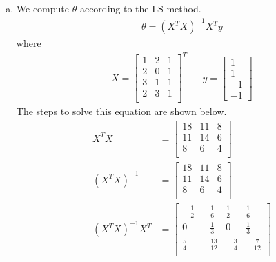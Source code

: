 \documentclass[a4paper, 10pt, twoside]{article}
\begin{document}
\begin{enumerate}[a)]
    \item We compute $\theta$ according to the LS-method.
          \begin{align}
              \theta = (X^TX)^{-1}X^Ty
          \end{align}
          where
          \begin{align*}
              X =
              \begin{bmatrix}
                  1 & 2 & 1 \\
                  2 & 0 & 1 \\
                  3 & 1 & 1 \\
                  2 & 3 & 1 \\
              \end{bmatrix}^T
               &  &
              y =
              \begin{bmatrix}
                  1 \\ 1 \\ -1 \\ -1
              \end{bmatrix}
          \end{align*}
          The steps to solve this equation are shown below.
          \begin{align*}
              X^TX           & =
              \begin{bmatrix}
                  18 & 11 & 8 \\
                  11 & 14 & 6 \\
                  8  & 6  & 4 \\
              \end{bmatrix} \\
              (X^TX)^{-1}    & =
              \begin{bmatrix}
                  18 & 11 & 8 \\
                  11 & 14 & 6 \\
                  8  & 6  & 4 \\
              \end{bmatrix} \\
              (X^TX)^{-1}X^T & =
              \begin{bmatrix}
                  -\frac{1}{2} & -\frac{1}{6}   & \frac{1}{2}  & \frac{1}{6}   \\
                  0            & -\frac{1}{3}   & 0            & \frac{1}{3}   \\
                  \frac{5}{4}  & -\frac{13}{12} & -\frac{3}{4} & -\frac{7}{12} \\

\end{bmatrix}
\end{align*}
\end{enumerate}
\end{document}
